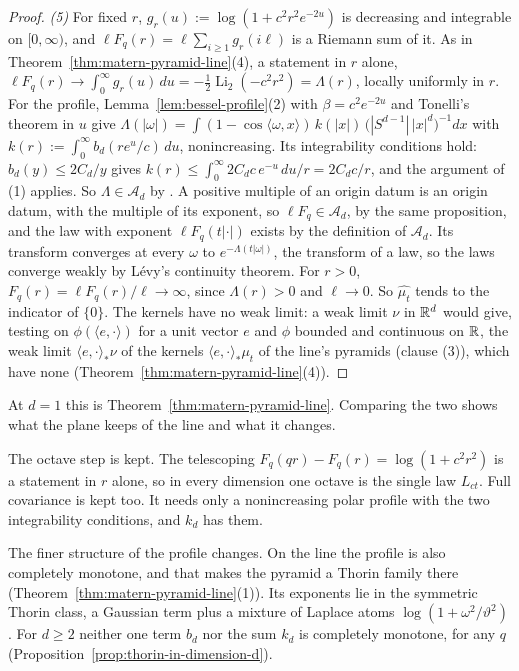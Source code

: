 \begin{proof}
\emph{(5)} For fixed $r$, $g_r(u) := \log(1 + c^2r^2e^{-2u})$ is decreasing and integrable on
$[0, \infty)$, and $\ell F_q(r) = \ell\sum_{i \ge 1}g_r(i\ell)$ is a Riemann sum of it. As in
Theorem~\ref{thm:matern-pyramid-line}(4), a statement in $r$ alone, $\ell F_q(r) \to \int_0^\infty
g_r(u)\,du = -\tfrac12\operatorname{Li}_2(-c^2r^2) = \Lambda(r)$, locally uniformly in $r$. For the
profile, Lemma~\ref{lem:bessel-profile}(2) with $\beta = c^2e^{-2u}$ and Tonelli's theorem in $u$
give $\Lambda(|\omega|) = \int(1 - \cos\langle\omega, x\rangle)\,k(|x|)\,
\bigl(|S^{d-1}|\,|x|^d\bigr)^{-1}dx$ with $k(r) := \int_0^\infty b_d(re^u/c)\,du$, nonincreasing.
Its integrability conditions hold: $b_d(y) \le 2C_d/y$ gives
$k(r) \le \int_0^\infty 2C_dc\,e^{-u}\,du/r = 2C_dc/r$, and the argument of (1) applies. So
$\Lambda \in \mathcal{A}_d$ by
. A positive multiple of an origin datum
is an origin datum, with the multiple of its exponent, so $\ell F_q \in \mathcal{A}_d$, by the same
proposition, and the law with exponent $\ell F_q(t|\cdot|)$ exists by the definition of
$\mathcal{A}_d$. Its transform converges at every $\omega$ to $e^{-\Lambda(t|\omega|)}$, the transform
of a law, so the laws converge weakly by Lévy's continuity theorem. For $r > 0$,
$F_q(r) = \ell F_q(r)/\ell \to \infty$, since $\Lambda(r) > 0$ and $\ell \to 0$. So
$\widehat{\mu_t}$ tends to the indicator of $\{0\}$.
The kernels have no weak limit: a weak limit $\nu$ in $\mathbb{R}^d$ would give, testing on
$\phi(\langle e, \cdot\rangle)$ for a unit vector $e$ and $\phi$ bounded and continuous on $\mathbb{R}$,
the weak limit $\langle e, \cdot\rangle_*\nu$ of the kernels $\langle e, \cdot\rangle_*\mu_t$ of
the line's \Matern{} pyramids (clause (3)), which have none
(Theorem~\ref{thm:matern-pyramid-line}(4)).
\end{proof}

At $d = 1$ this is Theorem~\ref{thm:matern-pyramid-line}. Comparing the two shows what the plane
keeps of the line and what it changes.

The octave step is kept. The telescoping $F_q(qr) - F_q(r) = \log(1 + c^2r^2)$ is a statement in
$r$ alone, so in every dimension one octave is the single law $L_{ct}$. Full covariance is kept too.
It needs only a nonincreasing polar profile with the two integrability conditions, and $k_d$ has
them.

The finer structure of the profile changes. On the line the profile is also completely monotone,
and that makes the \Matern{} pyramid a Thorin family there
(Theorem~\ref{thm:matern-pyramid-line}(1)). Its exponents lie in the symmetric Thorin class, a
Gaussian term plus a mixture of Laplace atoms $\log(1 + \omega^2/\vartheta^2)$. For $d \ge 2$
neither one term $b_d$ nor the sum $k_d$ is completely monotone, for any $q$
(Proposition~\ref{prop:thorin-in-dimension-d}).

